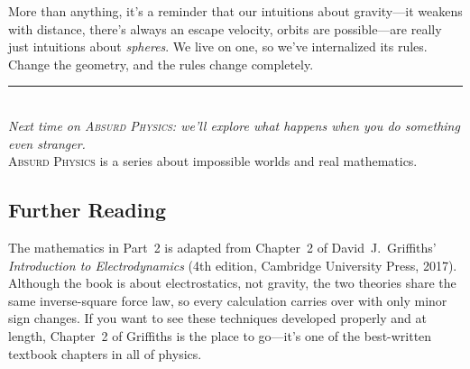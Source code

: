 \documentclass[11pt, letterpaper]{article}
\newcommand{\seriesname}{\textsc{Absurd Physics}}
\begin{document}
More than anything, it's a reminder that our intuitions about gravity---it weakens with distance, there's always an escape velocity, orbits are possible---are really just intuitions about \textit{spheres}. We live on one, so we've internalized its rules. Change the geometry, and the rules change completely.

\vspace{1cm}
\begin{center}
\rule{0.4\textwidth}{0.5pt}\\[8pt]
{\small\textit{Next time on \seriesname: we'll explore what happens when you do something even stranger.}}\\[4pt]
{\footnotesize \seriesname{} is a series about impossible worlds and real mathematics.}
\end{center}

\vspace{1cm}

\subsection*{Further Reading}

The mathematics in Part~2 is adapted from Chapter~2 of David~J.\ Griffiths' \textit{Introduction to Electrodynamics} (4th edition, Cambridge University Press, 2017). Although the book is about electrostatics, not gravity, the two theories share the same inverse-square force law, so every calculation carries over with only minor sign changes. If you want to see these techniques developed properly and at length, Chapter~2 of Griffiths is the place to go---it's one of the best-written textbook chapters in all of physics.
\end{document}
